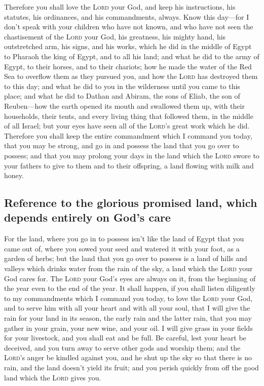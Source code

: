  Therefore you shall love the \textsc{Lord} your God, and
keep his instructions, his statutes, his ordinances, and his
commandments, always.  Know this day---for I don't speak
with your children who have not known, and who have not seen the
chastisement of the \textsc{Lord} your God, his greatness, his mighty
hand, his outstretched arm,  his signs, and his works,
which he did in the middle of Egypt to Pharaoh the king of Egypt, and to
all his land;  and what he did to the army of Egypt, to
their horses, and to their chariots; how he made the water of the Red
Sea to overflow them as they pursued you, and how the \textsc{Lord} has
destroyed them to this day;  and what he did to you in the
wilderness until you came to this place;  and what he did
to Dathan and Abiram, the sons of Eliab, the son of Reuben---how the
earth opened its mouth and swallowed them up, with their households,
their tents, and every living thing that followed them, in the middle of
all Israel;  but your eyes have seen all of the
\textsc{Lord}'s great work which he did.  Therefore you
shall keep the entire commandment which I command you today, that you
may be strong, and go in and possess the land that you go over to
possess;  and that you may prolong your days in the land
which the \textsc{Lord} swore to your fathers to give to them and to
their offspring, a land flowing with milk and honey.

\hypertarget{reference-to-the-glorious-promised-land-which-depends-entirely-on-gods-care}{%
\subsection{Reference to the glorious promised land, which depends
entirely on God's
care}\label{reference-to-the-glorious-promised-land-which-depends-entirely-on-gods-care}}

 For the land, where you go in to possess isn't like the
land of Egypt that you came out of, where you sowed your seed and
watered it with your foot, as a garden of herbs;  but the
land that you go over to possess is a land of hills and valleys which
drinks water from the rain of the sky,  a land which the
\textsc{Lord} your God cares for. The \textsc{Lord} your God's eyes are
always on it, from the beginning of the year even to the end of the
year.  It shall happen, if you shall listen diligently to
my commandments which I command you today, to love the \textsc{Lord}
your God, and to serve him with all your heart and with all your soul,
 that I will give the rain for your land in its season,
the early rain and the latter rain, that you may gather in your grain,
your new wine, and your oil.  I will give grass in your
fields for your livestock, and you shall eat and be full.
 Be careful, lest your heart be deceived, and you turn
away to serve other gods and worship them;  and the
\textsc{Lord}'s anger be kindled against you, and he shut up the sky so
that there is no rain, and the land doesn't yield its fruit; and you
perish quickly from off the good land which the \textsc{Lord} gives you.

